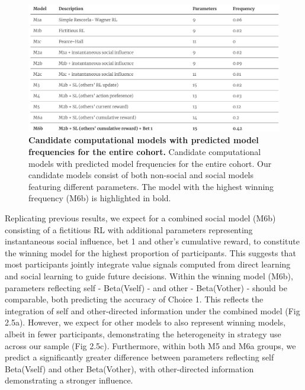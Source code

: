 \documentclass[12pt,a4paper,oneside,]{book} %
\begin{document}
\begin{figure}
\includegraphics[width=1\linewidth]{figures/models} \caption{{\textbf{Candidate computational models with predicted model frequencies for the entire cohort.} Candidate computational models with predicted model frequencies for the entire cohort. Our candidate models consist of both non-social and social models featuring different parameters. The model with the highest winning frequency (M6b) is highlighted in bold.}}\label{fig:figure-4-models}
\end{figure}



Replicating previous results, we expect for a combined social model (M6b) consisting of a fictitious RL with additional parameters representing instantaneous social influence, bet 1 and other's cumulative reward, to constitute the winning model for the highest proportion of participants. This suggests that most participants jointly integrate value signals computed from direct learning and social learning to guide future decisions. Within the winning model (M6b), parameters reflecting self - Beta(Vself) - and other - Beta(Vother) - should be comparable, both predicting the accuracy of Choice 1. This reflects the integration of self and other-directed information under the combined model (Fig 2.5a). However, we expect for other models to also represent winning models, albeit in fewer participants, demonstrating the heterogeneity in strategy use across our sample (Fig 2.5c). Furthermore, within both M5 and M6a groups, we predict a significantly greater difference between parameters reflecting self Beta(Vself) and other Beta(Vother), with other-directed information demonstrating a stronger influence.
\end{document}
